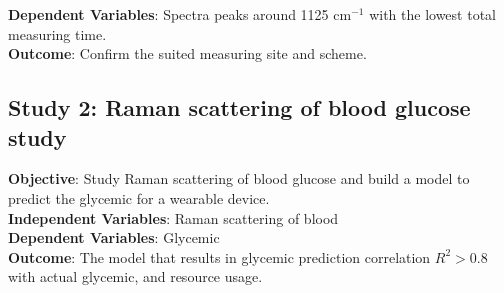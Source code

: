 \begin{sloppypar}
    \textbf{Dependent Variables}: Spectra peaks around 1125 $\text{cm}^{-1}$ with the lowest total measuring time.\\
    \textbf{Outcome}: Confirm the suited measuring site and scheme.
\end{sloppypar}




\subsection{Study 2: Raman scattering of blood glucose study}\label{intro-s2}

\textbf{Objective}: Study Raman scattering of blood glucose and build a model to predict the glycemic for a wearable device.\\
\textbf{Independent Variables}: Raman scattering of blood\\
\textbf{Dependent Variables}: Glycemic\\
\textbf{Outcome}: The model that results in glycemic prediction correlation $R^2 > 0.8$ with actual glycemic, and resource usage.




